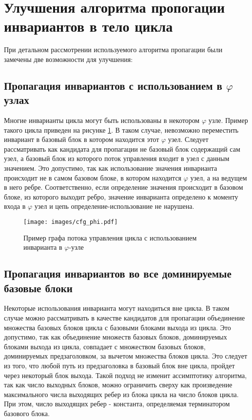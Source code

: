 \section{Улучшения алгоритма пропогации инвариантов в тело цикла}

При детальном рассмотрении используемого алгоритма пропагации были замечены две возможности для улучшения:

\subsection{Пропагация инвариантов с использованием в \texorpdfstring{$\varphi$}{phi} узлах}

Многие инварианты цикла могут быть использованы в некотором $\varphi$ узле.
Пример такого цикла приведен на рисунке \ref{fig:cfg_phi}.
В таком случае, невозможно переместить инвариант в базовый блок в котором находится этот $\varphi$ узел.
Следует рассматривать как кандидата для пропагации не базовый блок содержащий сам узел, а базовый блок из которого поток управления входит в узел с данным значением.
Это допустимо, так как использование значения инварианта происходит не в самом базовом блоке, в котором находится $\varphi$ узел, а на ведущем в него ребре.
Соответственно, если определение значения происходит в базовом блоке, из которого выходит ребро, значение инварианта определено к моменту входа в $\varphi$ узел и цепь определение-использование не нарушена.

\begin{figure}
    \centering
    \texttt{[image: images/cfg\_phi.pdf]}
    \caption{Пример графа потока управления цикла с использованием инварианта в $\varphi$-узле}
    \label{fig:cfg_phi}
\end{figure}

\subsection{Пропагация инвариантов во все доминируемые базовые блоки}

Некоторые использования инварианта могут находиться вне цикла.
В таком случае можно рассматривать в качестве кандидатов для пропагации объединение множества базовых блоков цикла с базовыми блоками выхода из цикла.
Это допустимо, так как объединение множеств базовых блоков, доминируемых блоками выхода из цикла, совпадает с множеством базовых блоков, доминируемых предзаголовком, за вычетом множества блоков цикла.
Это следует из того, что любой путь из предзаголовка в базовый блок вне цикла, пройдет через некоторый блок выхода.
Такой подход не изменит ассимптотику алгоритма, так как число выходных блоков, можно ограничить сверху как произведение максимального числа выходящих ребер из блока цикла на число блоков цикла.
При этом, число выходящих ребер - константа, определяемая терминатором базового блока.

